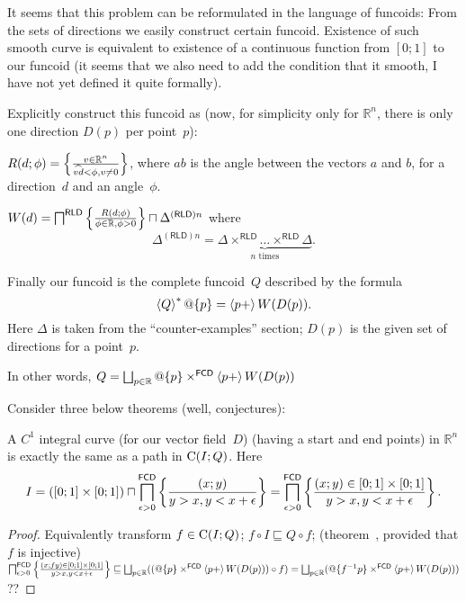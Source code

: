 It seems that this problem can be reformulated in the language of funcoids: From the sets of directions we easily construct certain funcoid.
Existence of such smooth curve is equivalent to existence of a continuous function from $[0;1]$ to our funcoid (it seems that we also need to add the
condition that it smooth, I have not yet defined it quite formally).

Explicitly construct this funcoid as (now, for simplicity only for $\mathbb{R}^n$, there is only one direction $D(p)$ per point~$p$):

$R(d;\phi) = \left\{ \frac{v\in\mathbb{R}^n}{\widehat{vd}<\phi, v\ne 0}\right\}$,
where $\widehat{ab}$ is the angle between the vectors $a$ and $b$,
for a direction~$d$ and an angle~$\phi$.

$W(d) = \bigsqcap^{\mathsf{RLD}}\left\{ \frac{R(d;\phi)}{\phi\in\mathbb{R},\phi>0}\right\} \sqcap \Delta^{(\mathsf{RLD})n}$
where \[ \Delta^{(\mathsf{RLD})n} = \underbrace{\Delta\times^{\mathsf{RLD}}\dots\times^{\mathsf{RLD}}\Delta}_{n\text{ times}}. \]

Finally our funcoid is the complete funcoid~$Q$ described by the formula
\[ \left\langle Q\right\rangle ^{\ast}@\{p\} = \left\langle p+\right\rangle W(D(p)). \]
Here $\Delta$ is taken from the ``counter-examples'' section;
$D(p)$ is the given set of directions for a point~$p$.

In other words, $Q = \bigsqcup_{p\in\mathbb{R}} @\{p\}\times^{\mathsf{FCD}}\left\langle p+\right\rangle{W(D(p))}$


Consider three below theorems (well, conjectures):

\begin{thm}
A $C^1$ integral curve (for our vector field~$D$) (having a start and end points) in $\mathbb{R}^n$ is exactly the same as a path in $\mathrm{C}(I;Q)$.
Here \[ I = ([0;1]\times[0;1]) \sqcap \bigsqcap^{\mathsf{FCD}}_{\epsilon>0} \left\{ \frac{(x;y)}{y>x, y<x+\epsilon}\right\} =
\bigsqcap^{\mathsf{FCD}}_{\epsilon>0} \left\{ \frac{(x;y)\in[0;1]\times[0;1]}{y>x, y<x+\epsilon}\right\}
. \]
\end{thm}

\begin{proof}
Equivalently transform $f\in\mathrm{C}(I;Q)$; $f\circ I\sqsubseteq Q\circ f$; (theorem~, provided that $f$ is injective)
$\bigsqcap^{\mathsf{FCD}}_{\epsilon>0} \left\{ \frac{(x;fy)\in[0;1]\times[0;1]}{y>x, y<x+\epsilon}\right\} \sqsubseteq
\bigsqcup_{p\in\mathbb{R}} ((@\{p\}\times^{\mathsf{FCD}}\left\langle p+\right\rangle{W(D(p))}) \circ f) =
\bigsqcup_{p\in\mathbb{R}} (@\{f^{-1}p\}\times^{\mathsf{FCD}}\left\langle p+\right\rangle{W(D(p))})$
??
\end{proof}

